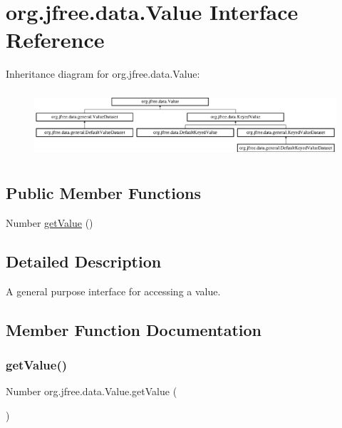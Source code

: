 \hypertarget{interfaceorg_1_1jfree_1_1data_1_1_value}{}\section{org.\+jfree.\+data.\+Value Interface Reference}
\label{interfaceorg_1_1jfree_1_1data_1_1_value}
Inheritance diagram for org.\+jfree.\+data.\+Value\+:\begin{figure}[H]
\begin{center}
\leavevmode
\includegraphics[height=2.497213cm]{interfaceorg_1_1jfree_1_1data_1_1_value}
\end{center}
\end{figure}
\subsection*{Public Member Functions}
\begin{DoxyCompactItemize}
\item 
Number \mbox{\hyperlink{interfaceorg_1_1jfree_1_1data_1_1_value_a70e7f25d71cbb7eb0cdad970adcfe4b9}{get\+Value}} ()
\end{DoxyCompactItemize}


\subsection{Detailed Description}
A general purpose interface for accessing a value. 

\subsection{Member Function Documentation}
\mbox{\label{interfaceorg_1_1jfree_1_1data_1_1_value_a70e7f25d71cbb7eb0cdad970adcfe4b9}} 
\subsubsection{\texorpdfstring{get\+Value()}{getValue()}}
{\footnotesize\ttfamily Number org.\+jfree.\+data.\+Value.\+get\+Value (\begin{DoxyParamCaption}{ }\end{DoxyParamCaption})}

